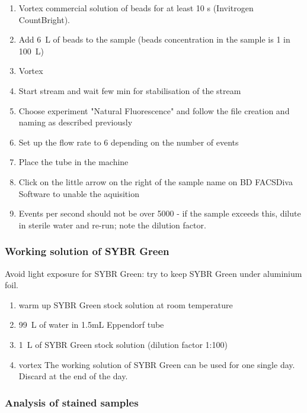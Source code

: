 \begin{enumerate}
\item Vortex commercial solution of beads for at least 10 s (Invitrogen CountBright).
\item Add 6~\textmu L of beads to the sample (beads concentration in the sample is 1 in 100~\textmu L)
\item Vortex 
\item Start stream and wait few min for stabilisation of the stream
\item Choose experiment "Natural Fluorescence" and follow the file creation and naming as described previously
\item Set up the flow rate to 6 depending on the number of events 
\item Place the tube in the machine
\item Click on the little arrow on the right of the sample name on BD FACSDiva Software to unable the aquisition
\item Events per second should not be over 5000 - if the sample exceeds this, dilute in sterile water and re-run; note the dilution factor.
\end{enumerate}

\subsubsection{Working solution of SYBR Green}
Avoid light exposure for SYBR Green: try to keep SYBR Green under aluminium foil.
\begin{enumerate}
\item warm up SYBR Green stock solution at room temperature
\item 99~\textmu L of water in 1.5mL Eppendorf tube
\item 1~\textmu L of SYBR Green stock solution (dilution factor 1:100)
\item vortex
The working solution of SYBR Green can be used for one single day. Discard at the end of the day.
\end{enumerate}

\subsubsection{Analysis of stained samples}

